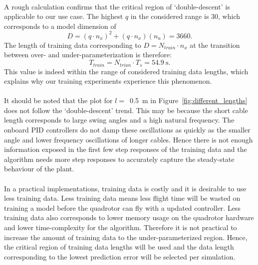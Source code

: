         \paragraph{}
        A rough calculation confirms that the critical region of `double-descent' is applicable to our use case.
        The highest $q$ in the considered range is 30, which corresponds to a model dimension of 
        \begin{equation}
            D = (q \cdot n_x)^2 + (q \cdot n_x)(n_u) = 3660 .
        \end{equation}
        The length of training data corresponding to $D = N_{train} \cdot n_x$ at the transition between over- and under-parameterization is therefore:
        \begin{equation}
            T_{train} = N_{trian} \cdot T_s = \SI{54.9}{\second} .
        \end{equation}
        This value is indeed within the range of considered training data lengths,
        which explains why our training experiments experience this phenomenon.

        \paragraph{}
        It should be noted that the plot for $l =$~\SI{0.5}{\metre} in Figure~\ref{fig:different_lengths}
        does not follow the `double-descent' trend.
        This may be because the short cable length corresponds to large swing angles and a high natural frequency.
        The onboard PID controllers do not damp these oscillations as quickly 
        as the smaller angle and lower frequency oscillations of longer cables.
        Hence there is not enough information exposed in the first few step responses of the training data and
        the algorithm needs more step responses to accurately capture the steady-state behaviour of the plant.

        \paragraph{}
        In a practical implementations, training data is costly and it is desirable to use less training data.
        Less training data means less flight time will be wasted on training a model before the quadrotor can fly with a updated controller.
        Less training data also corresponds to lower memory usage on the quadrotor hardware and lower time-complexity for the algorithm.
        Therefore it is not practical to increase the amount of training data to the under-parameterized region.
        Hence, the critical region of training data lengths will be used and
        the data length corresponding to the lowest prediction error will be selected per simulation.

